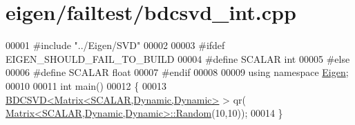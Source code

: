 \hypertarget{eigen_2failtest_2bdcsvd__int_8cpp_source}{}\section{eigen/failtest/bdcsvd\+\_\+int.cpp}
\label{eigen_2failtest_2bdcsvd__int_8cpp_source}

\begin{DoxyCode}
00001 \textcolor{preprocessor}{#include "../Eigen/SVD"}
00002 
00003 \textcolor{preprocessor}{#ifdef EIGEN\_SHOULD\_FAIL\_TO\_BUILD}
00004 \textcolor{preprocessor}{#define SCALAR int}
00005 \textcolor{preprocessor}{#else}
00006 \textcolor{preprocessor}{#define SCALAR float}
00007 \textcolor{preprocessor}{#endif}
00008 
00009 \textcolor{keyword}{using namespace }\hyperlink{namespace_eigen}{Eigen};
00010 
00011 \textcolor{keywordtype}{int} main()
00012 \{
00013   \hyperlink{group___s_v_d___module_class_eigen_1_1_b_d_c_s_v_d}{BDCSVD<Matrix<SCALAR,Dynamic,Dynamic>} > qr(
      \hyperlink{group___core___module_class_eigen_1_1_matrix}{Matrix<SCALAR,Dynamic,Dynamic>::Random}(10,10));
00014 \}
\end{DoxyCode}

